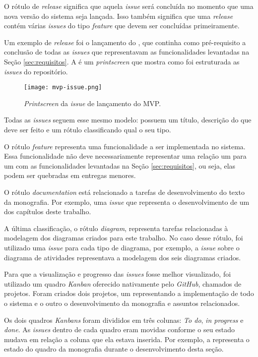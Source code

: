 O rótulo de \textit{release} significa que aquela \textit{issue} será concluída no momento que uma nova versão do sistema seja lançada. Isso também significa que uma \textit{release} contém várias \textit{issues} do tipo \textit{feature} que devem ser concluídas primeiramente.

Um exemplo de \textit{release} foi o lançamento do , que continha como pré-requisito a conclusão de todas as \textit{issues} que representavam as funcionalidades levantadas na Seção \ref{sec:requisitos}. A  é um \textit{printscreen} que mostra como foi estruturada as \textit{issues} do repositório.

\begin{figure}[!htb]
  \centering
  \texttt{[image: mvp-issue.png]}
  \caption{\textit{Printscreen} da \textit{issue} de lançamento do MVP.}
  \label{fig:issuemvp}
\end{figure}

Todas as \textit{issues} seguem esse mesmo modelo: possuem um título, descrição do que deve ser feito e um rótulo classificando qual o seu tipo.

O rótulo \textit{feature} representa uma funcionalidade a ser implementada no sistema. Essa funcionalidade não deve necessariamente representar uma relação um para um com as funcionalidades levantadas na Seção \ref{sec:requisitos}, ou seja, elas podem ser quebradas em entregas menores.

O rótulo \textit{documentation} está relacionado a tarefas de desenvolvimento do texto da monografia. Por exemplo, uma \textit{issue} que representa o desenvolvimento de um dos capítulos deste trabalho.

A última classificação, o rótulo \textit{diagram}, representa tarefas relacionadas à modelagem dos diagramas criados para este trabalho. No caso desse rótulo, foi utilizado uma \textit{issue} para cada tipo de diagrama, por exemplo, a \textit{issue} sobre o diagrama de atividades representava a modelagem dos seis diagramas criados. 

Para que a visualização e progresso das \textit{issues} fosse melhor visualizado, foi utilizado um quadro \textit{Kanban} oferecido nativamente pelo \textit{GitHub}, chamados de projetos. Foram criados dois projetos, um representando a implementação de todo o sistema e o outro o desenvolvimento da monografia e assuntos relacionados.

Os dois quadros \textit{Kanbans} foram divididos em três colunas: \textit{To do}, \textit{in progress} e \textit{done}. As \textit{issues} dentro de cada quadro eram movidas conforme o seu estado mudava em relação a coluna que ela estava inserida. Por exemplo, a  representa o estado do quadro da monografia durante o desenvolvimento desta seção.


